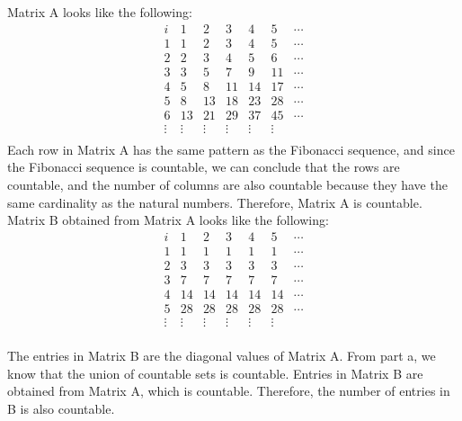 \documentclass[a4paper]{exam}
\begin{document}
\begin{questions}
\begin{solution}
    Matrix A looks like the following:
    \[
\begin{array}{cccccccc}
i& 1 & 2 & 3 & 4 & 5 & \cdots \\
\hline
1 & 1 & 2 & 3 & 4 & 5 & \cdots \\
2 & 2 & 3 & 4 & 5 & 6 & \cdots \\
3 & 3 & 5 & 7 & 9 & 11 & \cdots \\
4 & 5 & 8 & 11 & 14 & 17 & \cdots \\
5 & 8 & 13 & 18 & 23 & 28 & \cdots \\
6 & 13 & 21 & 29 & 37 & 45 & \cdots \\
\vdots & \vdots & \vdots & \vdots & \vdots & \vdots &  \\
\end{array}
\]
Each row in Matrix A has the same pattern as the Fibonacci sequence, and since the Fibonacci sequence is countable, we can conclude that the rows are countable, and the number of columns are also countable because they have the same cardinality as the natural numbers. Therefore, Matrix A is countable. \\
Matrix B obtained from Matrix A looks like the following:
 \[
\begin{array}{ccccccc}
i& 1 & 2 & 3 & 4 & 5 & \cdots \\
\hline
1 & 1 & 1 & 1 & 1 & 1 & \cdots \\
2 & 3 & 3 & 3 & 3 & 3 & \cdots \\
3 & 7 & 7 & 7 & 7 & 7 & \cdots \\
4 & 14 & 14 & 14 & 14 & 14 & \cdots \\
5 & 28 & 28 & 28 & 28 & 28 & \cdots \\
\vdots & \vdots & \vdots & \vdots & \vdots & \vdots &  \\
\end{array}
\]

The entries in Matrix B are the diagonal values of Matrix A. From part a, we know that the union of countable sets is countable. Entries in Matrix B are obtained from Matrix A, which is countable. Therefore, the number of entries in B is also countable.

    \end{solution}

\end{questions}
\end{document}
